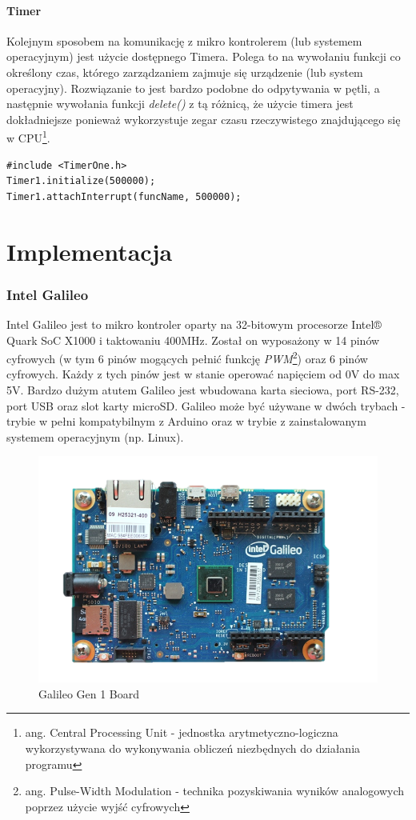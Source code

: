 \documentclass{xmgr}
\begin{document}
\subsubsection{Timer}
Kolejnym sposobem na komunikację z mikro kontrolerem (lub systemem operacyjnym) jest użycie dostępnego Timera. Polega to na wywołaniu funkcji co określony czas, którego zarządzaniem zajmuje się urządzenie (lub system operacyjny). Rozwiązanie to jest bardzo podobne do odpytywania w pętli, a następnie wywołania funkcji \emph{delete()} z tą różnicą, że użycie timera jest dokładniejsze ponieważ wykorzystuje zegar czasu rzeczywistego znajdującego się w CPU\footnote{ang. Central Processing Unit - jednostka arytmetyczno-logiczna wykorzystywana do wykonywania obliczeń niezbędnych do działania programu}.
\begin{lstlisting}[label=bot-dirs-alg,caption=Przykładowe użycie timer w środowisku Arduino]
#include <TimerOne.h>
Timer1.initialize(500000);
Timer1.attachInterrupt(funcName, 500000);
\end{lstlisting}


\chapter{Implementacja}
\subsection{Intel Galileo}
Intel Galileo jest  to mikro kontroler oparty na 32-bitowym procesorze Intel® Quark SoC X1000 i taktowaniu 400MHz. Został on wyposażony w 14 pinów cyfrowych (w tym 6 pinów mogących pełnić funkcję \emph{PWM}\footnote{ang. Pulse-Width Modulation - technika pozyskiwania wyników analogowych poprzez użycie wyjść cyfrowych}) oraz 6 pinów cyfrowych. Każdy z tych pinów jest w stanie operować napięciem od 0V do max 5V. Bardzo dużym atutem Galileo jest wbudowana karta sieciowa, port RS-232, port USB oraz slot karty microSD. Galileo może być używane w dwóch trybach - trybie w pełni kompatybilnym z Arduino oraz w trybie z zainstalowanym systemem operacyjnym (np. Linux).\cite{GalileoBook}

\begin{figure}[!h]
    \centering
    \includegraphics[height=0.4\textwidth]{images/galileo.png}
    \caption{Galileo Gen 1 Board \label{Galileo Gen 1 Board}}
\end{figure}
\end{document}
